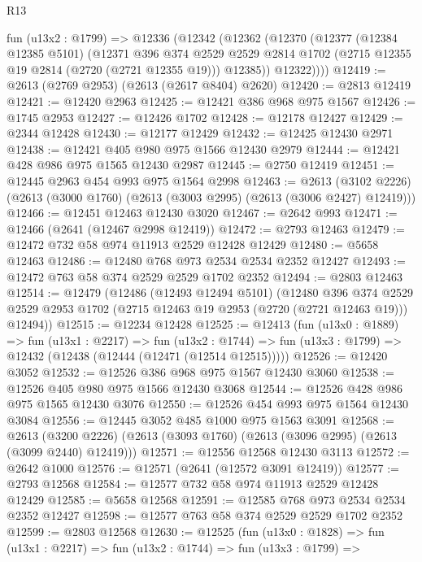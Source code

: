 \begin{lexlean}{R13}
\begin{coremodule}
    fun (u13x2 : @1799) =>
    @12336
      (@12342
        (@12362
          (@12370
            (@12377
              (@12384 @12385 @5101)
              (@12371
                @396
                @374
                @2529
                @2529
                @2814
                @1702
                (@2715 @12355 @19 @2814 (@2720 (@2721 @12355 @19)))
                @12385))
            @12322))))
@12419 := @2613 (@2769 @2953) (@2613 (@2617 @8404) @2620)
@12420 := @2813 @12419
@12421 := @12420 @2963
@12425 := @12421 @386 @968 @975 @1567
@12426 := @1745 @2953
@12427 := @12426 @1702
@12428 := @12178 @12427
@12429 := @2344 @12428
@12430 := @12177 @12429
@12432 := @12425 @12430 @2971
@12438 := @12421 @405 @980 @975 @1566 @12430 @2979
@12444 := @12421 @428 @986 @975 @1565 @12430 @2987
@12445 := @2750 @12419
@12451 := @12445 @2963 @454 @993 @975 @1564 @2998
@12463 := @2613
    (@3102 @2226)
    (@2613 (@3000 @1760) (@2613 (@3003 @2995) (@2613 (@3006 @2427) @12419)))
@12466 := @12451 @12463 @12430 @3020
@12467 := @2642 @993
@12471 := @12466 (@2641 (@12467 @2998 @12419))
@12472 := @2793 @12463
@12479 := @12472 @732 @58 @974 @11913 @2529 @12428 @12429
@12480 := @5658 @12463
@12486 := @12480 @768 @973 @2534 @2534 @2352 @12427
@12493 := @12472 @763 @58 @374 @2529 @2529 @1702 @2352
@12494 := @2803 @12463
@12514 := @12479
    (@12486
      (@12493 @12494 @5101)
      (@12480
        @396
        @374
        @2529
        @2529
        @2953
        @1702
        (@2715 @12463 @19 @2953 (@2720 (@2721 @12463 @19)))
        @12494))
@12515 := @12234 @12428
@12525 := @12413
    (fun (u13x0 : @1889) =>
    fun (u13x1 : @2217) =>
    fun (u13x2 : @1744) => fun (u13x3 : @1799) => @12432 (@12438 (@12444 (@12471 (@12514 @12515)))))
@12526 := @12420 @3052
@12532 := @12526 @386 @968 @975 @1567 @12430 @3060
@12538 := @12526 @405 @980 @975 @1566 @12430 @3068
@12544 := @12526 @428 @986 @975 @1565 @12430 @3076
@12550 := @12526 @454 @993 @975 @1564 @12430 @3084
@12556 := @12445 @3052 @485 @1000 @975 @1563 @3091
@12568 := @2613
    (@3200 @2226)
    (@2613 (@3093 @1760) (@2613 (@3096 @2995) (@2613 (@3099 @2440) @12419)))
@12571 := @12556 @12568 @12430 @3113
@12572 := @2642 @1000
@12576 := @12571 (@2641 (@12572 @3091 @12419))
@12577 := @2793 @12568
@12584 := @12577 @732 @58 @974 @11913 @2529 @12428 @12429
@12585 := @5658 @12568
@12591 := @12585 @768 @973 @2534 @2534 @2352 @12427
@12598 := @12577 @763 @58 @374 @2529 @2529 @1702 @2352
@12599 := @2803 @12568
@12630 := @12525
    (fun (u13x0 : @1828) =>
    fun (u13x1 : @2217) =>
    fun (u13x2 : @1744) =>
    fun (u13x3 : @1799) =>

\end{coremodule}
\end{lexlean}
